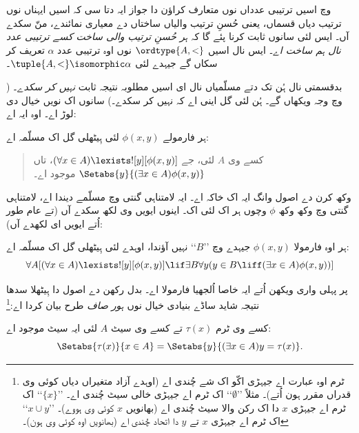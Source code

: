 \documentclass[../../../include/open-logic-section]{subfiles}
\begin{document}

 وچ اسیں ترتیبی عدداں نوں متعارف کراؤن دا
جواز ایہ دتا سی کہ اسیں ایہناں نوں ترتیب دیاں قسماں، یعنی حُسنِ ترتیب
والیاں ساختاں دے معیاری نمائندے، منّ سکدے آں۔ ایس لئی سانوں ثابت کرنا
پئے گا کہ \emph{ہر حُسنِ ترتیب والی ساخت کسے ترتیبی عدد نال ہم ساخت اے}۔
ایس نال اسیں $\ordtype{A, <}$ نوں اوہ ترتیبی عدد $\alpha$ تعریف کر سکاں گے
جیہدے لئی $\tuple{A, <} \isomorphic \alpha$۔

بدقسمتی نال ہُن تک دتے مسلّمیاں نال ای اسیں مطلوبہ نتیجہ ثابت
\emph{نہیں کر سکدے}۔ ( وچ وجہ ویکھاں گے۔
ہُن لئی گل اینی اے کہ نہیں کر سکدے۔) سانوں اک نویں خیال دی لوڑ اے۔ اوہ ایہ اے:

\begin{axiom}
ہر فارمولے $\phi(x, y)$ لئی ہِیٹھلی گل اک مسلّمہ اے:
\begin{quote}
	کسے وی $A$ لئی، جے $(\forall x \in A)\lexists![y][\phi(x,y)]$، تاں
	$\Setabs{y}{(\exists x \in A)\phi(x,y)}$ موجود اے۔
\end{quote}
\end{axiom}
\noindent
وکھ کرن دے اصول وانگ ایہ اک خاکہ اے۔ ایہ لامتناہی گنتی وچ مسلّمے دیندا اے،
لامتناہی گنتی وچ وکھ وکھ $\phi$ وچوں ہر اک لئی اک۔ اینوں ایویں وی لکھ
سکدے آں (تے عام طور اُتے ایویں ای لکھدے آں):

\begin{defish}
ہر اوہ فارمولا $\phi(x,y)$ جیہدے وچ ’’$B$‘‘ نہیں آؤندا، اوہدے لئی
ہِیٹھلی گل اک مسلّمہ اے:
\[
\forall A[(\forall x \in A)\lexists![y][\phi(x,y)] \lif \exists B\forall y (y \in B \liff (\exists x \in A)\phi(x,y))]
\]
\end{defish}

پر پہلی واری ویکھن اُتے ایہ خاصا اُلجھیا فارمولا اے۔ بدل رکھن دے اصول
دا ہِیٹھلا سدھا نتیجہ شاید ساڈے بنیادی خیال نوں \emph{ہور صاف} طرح
بیان کردا اے:\footnote{ٹرم اوہ عبارت اے جیہڑی اکّو اک شے چُندی اے
(اوہدے آزاد متغیراں دیاں کوئی وی قدراں مقرر ہون اُتے)۔ مثلاً ’’$\emptyset$‘‘
اک ٹرم اے جیہڑی خالی سیٹ چُندی اے۔ ’’$\{x\}$‘‘ اک ٹرم اے جیہڑی
$x$ دا اک رکن والا سیٹ چُندی اے (بھانویں $x$ کوئی وی ہووے)۔
’’$x \cup y$‘‘ اک ٹرم اے جیہڑی $x$ تے $y$ دا اتحاد چُندی اے
(بھانویں اوہ کوئی وی ہون)۔}

\begin{cor}
کسے وی ٹرم $\tau(x)$ تے کسے وی سیٹ $A$ لئی ایہ سیٹ موجود اے:
\[
	\Setabs{\tau(x)}{x \in A} = \Setabs{y}{(\exists x \in A)y = \tau(x)}.
\]
\end{cor}
\end{document}
